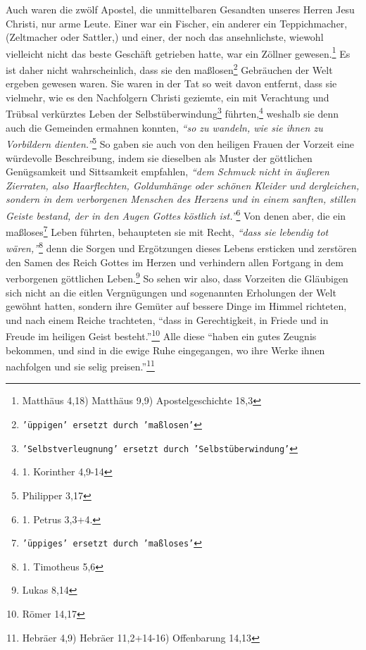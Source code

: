 Auch waren die zwölf Apostel, die unmittelbaren
Gesandten unseres Herren Jesu
Christi, nur arme Leute. Einer war ein Fischer, ein
anderer ein
Teppichmacher,
(Zeltmacher oder Sattler,) und einer, der noch das ansehnlichste, wiewohl
vielleicht nicht das beste Geschäft getrieben hatte, war ein
Zöllner
gewesen.\footnote{Matthäus 4,18) Matthäus 9,9) Apostelgeschichte 18,3}
Es ist daher nicht wahrscheinlich, dass sie den
maßlosen\footnote{\texttt{'üppigen' ersetzt
durch 'maßlosen'}} Gebräuchen der Welt ergeben
gewesen waren. Sie waren in der Tat so weit davon entfernt, dass sie vielmehr,
wie es den Nachfolgern Christi geziemte, ein mit Verachtung und Trübsal
verkürztes Leben der Selbstüberwindung\footnote{\texttt{'Selbstverleugnung'
ersetzt durch
'Selbstüberwindung'}} führten,\footnote{1. Korinther 4,9-14}
weshalb sie denn auch die Gemeinden ermahnen konnten,
\textit{"`so zu wandeln, wie sie ihnen zu Vorbildern
dienten."'}\footnote{Philipper 3,17}
So gaben sie auch von den heiligen
Frauen der
Vorzeit
eine würdevolle Beschreibung, indem sie dieselben als Muster
der göttlichen Genügsamkeit und Sittsamkeit empfahlen,
\textit{"`dem Schmuck nicht in
äußeren Zierraten, also Haarflechten, Goldumhänge oder schönen Kleider und
dergleichen,
sondern in dem verborgenen Menschen des Herzens und in einem sanften, stillen
Geiste bestand, der in den Augen Gottes köstlich ist."'}\footnote{1. Petrus
3,3+4.}
Von denen aber, die ein maßloses\footnote{\texttt{'üppiges' ersetzt durch
'maßloses'}} Leben
führten, behaupteten sie mit Recht,
\textit{"`dass sie lebendig tot wären,"'}\footnote{1.
Timotheus 5,6}
denn die Sorgen und
Ergötzungen dieses Lebens ersticken und zerstören den Samen des Reich
Gottes im
Herzen und verhindern allen Fortgang in dem verborgenen göttlichen
Leben.\footnote{Lukas 8,14}
So sehen wir also, dass Vorzeiten die Gläubigen sich
nicht an die eitlen Vergnügungen und sogenannten Erholungen der Welt gewöhnt
hatten, sondern ihre Gemüter auf bessere Dinge im Himmel
richteten, und nach
einem Reiche trachteten,
"`dass in Gerechtigkeit, in Friede und in Freude im
heiligen Geist besteht."'\footnote{Römer 14,17}
Alle diese
"`haben ein gutes
Zeugnis bekommen, und sind in die ewige Ruhe eingegangen, wo ihre Werke ihnen
nachfolgen und sie selig preisen."'\footnote{Hebräer 4,9) Hebräer
11,2+14-16)
Offenbarung 14,13}




